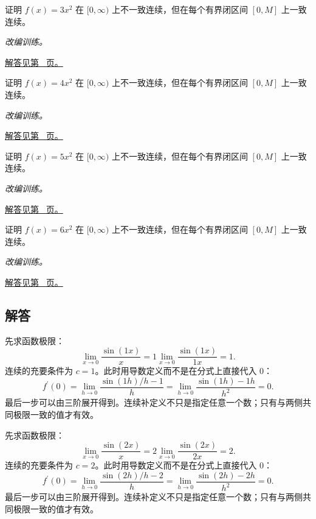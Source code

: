 \documentclass[12pt,fontset=fandol]{ctexart}
\begin{document}
\begin{example}[用点列否定一致连续]\label{ex:c6q21}
证明 $f(x)=3x^2$ 在 $[0,\infty)$ 上不一致连续，但在每个有界闭区间 $[0,M]$ 上一致连续。
\par\textit{改编训练。}\par\hyperref[ans:c6q21]{解答见第~\pageref{ans:c6q21} 页。}
\end{example}
\begin{example}[用点列否定一致连续]\label{ex:c6q22}
证明 $f(x)=4x^2$ 在 $[0,\infty)$ 上不一致连续，但在每个有界闭区间 $[0,M]$ 上一致连续。
\par\textit{改编训练。}\par\hyperref[ans:c6q22]{解答见第~\pageref{ans:c6q22} 页。}
\end{example}
\begin{example}[用点列否定一致连续]\label{ex:c6q23}
证明 $f(x)=5x^2$ 在 $[0,\infty)$ 上不一致连续，但在每个有界闭区间 $[0,M]$ 上一致连续。
\par\textit{改编训练。}\par\hyperref[ans:c6q23]{解答见第~\pageref{ans:c6q23} 页。}
\end{example}
\begin{example}[用点列否定一致连续]\label{ex:c6q24}
证明 $f(x)=6x^2$ 在 $[0,\infty)$ 上不一致连续，但在每个有界闭区间 $[0,M]$ 上一致连续。
\par\textit{改编训练。}\par\hyperref[ans:c6q24]{解答见第~\pageref{ans:c6q24} 页。}
\end{example}
\subsection{解答}
\begin{solve}\label{ans:c6q1}
先求函数极限：
\[
\lim_{x\to0}\frac{\sin(1x)}x=1\lim_{x\to0}\frac{\sin(1x)}{1x}=1.
\]
连续的充要条件为 $c=1$。此时用导数定义而不是在分式上直接代入 $0$：
\[
f^{\prime}(0)=\lim_{h\to0}\frac{\sin(1h)/h-1}h=\lim_{h\to0}\frac{\sin(1h)-1h}{h^2}=0.
\]
最后一步可以由三阶展开得到。连续补定义不只是指定任意一个数；只有与两侧共同极限一致的值才有效。
\end{solve}

\begin{solve}\label{ans:c6q2}
先求函数极限：
\[
\lim_{x\to0}\frac{\sin(2x)}x=2\lim_{x\to0}\frac{\sin(2x)}{2x}=2.
\]
连续的充要条件为 $c=2$。此时用导数定义而不是在分式上直接代入 $0$：
\[
f^{\prime}(0)=\lim_{h\to0}\frac{\sin(2h)/h-2}h=\lim_{h\to0}\frac{\sin(2h)-2h}{h^2}=0.
\]
最后一步可以由三阶展开得到。连续补定义不只是指定任意一个数；只有与两侧共同极限一致的值才有效。
\end{solve}
\end{document}
